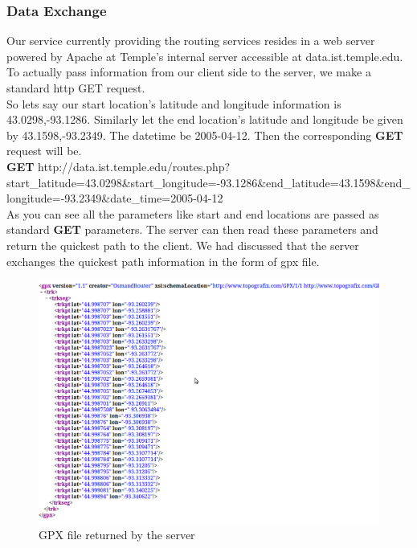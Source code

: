 \documentclass[a4paper,12pt, notitlepage, oneside, onecolumn]{article}
\begin{document}
\subsubsection{Data Exchange}
Our service currently providing the routing services resides in a web server powered by Apache at Temple's internal server accessible at data.ist.temple.edu. To actually pass information from our client side to the server, we make a standard http GET request.\\

So lets say our start location's latitude and longitude information is 43.0298,-93.1286. Similarly let the end location's latitude and longitude be given by 43.1598,-93.2349.
The datetime be 2005-04-12. Then the corresponding \textbf{GET} request will be.\\

\textbf{GET} http://data.ist.temple.edu/routes.php{?}start\_latitude=43.0298\&start\_longitude=-93.1286\&end\_latitude=43.1598\&end\_longitude=-93.2349\&date\_time=2005-04-12\\

As you can see all the parameters like start and end locations are passed as standard \textbf{GET} parameters. The server can then read these parameters and return the quickest path to the client. We had discussed that the server exchanges the quickest path information in the form of gpx\cite{gpx} file.

\begin{figure}[H]
\begin{minipage}[b]{1.0\linewidth}
\centering
\includegraphics[scale=0.4]{gpx.png}
\caption{GPX file returned by the server}
\label{fig:gpx}
\end{minipage}
\centering
\end{figure}
\end{document}
